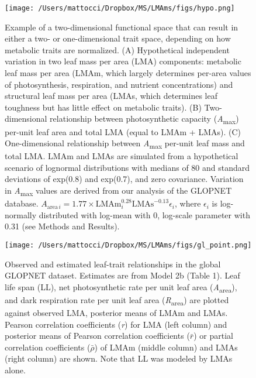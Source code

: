 \documentclass[
  12pt,
  a4paper,
,tablecaptionabove
]{scrartcl}
\begin{document}
\begin{figure}

{\centering \texttt{[image: /Users/mattocci/Dropbox/MS/LMAms/figs/hypo.png]}

}

\caption{\label{fig-Hplt}Example of a two-dimensional functional space
that can result in either a two- or one-dimensional trait space,
depending on how metabolic traits are normalized. (A) Hypothetical
independent variation in two leaf mass per area (LMA) components:
metabolic leaf mass per area (LMAm, which largely determines per-area
values of photosynthesis, respiration, and nutrient concentrations) and
structural leaf mass per area (LMAs, which determines leaf toughness but
has little effect on metabolic traits). (B) Two-dimensional relationship
between photosynthetic capacity (\emph{A}\textsubscript{max}) per-unit
leaf area and total LMA (equal to LMAm + LMAs). (C) One-dimensional
relationship between \emph{A}\textsubscript{max} per-unit leaf mass and
total LMA. LMAm and LMAs are simulated from a hypothetical scenario of
lognormal distributions with medians of 80 and standard deviations of
exp(0.8) and exp(0.7), and zero covariance. Variation in
\emph{A}\textsubscript{max} values are derived from our analysis of the
GLOPNET database.
\(A_{\mathrm{area} \, i}=1.77 \times \mathrm{LMAm}_i^{0.28}\mathrm{LMAs}^{-0.13}\epsilon_i\),
where \(\epsilon_i\) is log-normally distributed with log-mean with 0,
log-scale parameter with 0.31 (see Methods and Results).}

\end{figure}

\begin{figure}

{\centering \texttt{[image: /Users/mattocci/Dropbox/MS/LMAms/figs/gl\_point.png]}

}

\caption{\label{fig-GLplt}Observed and estimated leaf-trait
relationships in the global GLOPNET dataset. Estimates are from Model 2b
(Table 1). Leaf life span (LL), net photosynthetic rate per unit leaf
area (\emph{A}\textsubscript{area}), and dark respiration rate per unit
leaf area (\emph{R}\textsubscript{area}) are plotted against observed
LMA, posterior means of LMAm and LMAs. Pearson correlation coefficients
(\emph{r}) for LMA (left column) and posterior means of Pearson
correlation coefficients (\(\bar{r}\)) or partial correlation
coefficients (\(\bar{\rho}\)) of LMAm (middle column) and LMAs (right
column) are shown. Note that LL was modeled by LMAs alone.}

\end{figure}
\end{document}

